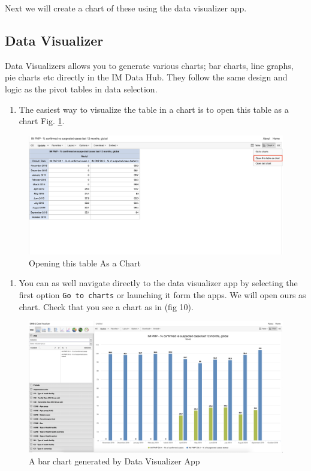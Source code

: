 \documentclass[]{book}
\providecommand{\tightlist}{%
  \setlength{\itemsep}{0pt}\setlength{\parskip}{0pt}}
\begin{document}
Next we will create a chart of these using the data visualizer app.

\hypertarget{visualizer}{%
\subsection{Data Visualizer}\label{visualizer}}

Data Visualizers allows you to generate various charts; bar charts, line graphs, pie charts etc directly in the IM Data Hub. They follow the same design and logic as the pivot tables in data selection.

\begin{enumerate}
\def\labelenumi{\arabic{enumi}.}
\tightlist
\item
  The easiest way to visualize the table in a chart is to open this table as a chart Fig. \ref{fig:visualizer}.
\end{enumerate}

\begin{figure}
\includegraphics[width=34.69in]{./images/visualizer} \caption{Opening this table As a Chart}\label{fig:visualizer}
\end{figure}

\begin{enumerate}
\def\labelenumi{\arabic{enumi}.}
\setcounter{enumi}{1}
\tightlist
\item
  You can as well navigate directly to the data visualizer app by selecting the first option \texttt{Go\ to\ charts} or launching it form the apps. We will open ours as chart. Check that you see a chart as in (fig 10).
\end{enumerate}

\begin{figure}
\includegraphics[width=46.64in]{./images/visualizer2} \caption{A bar chart generated by Data Visualizer App}\label{fig:visualizer2}
\end{figure}
\end{document}
